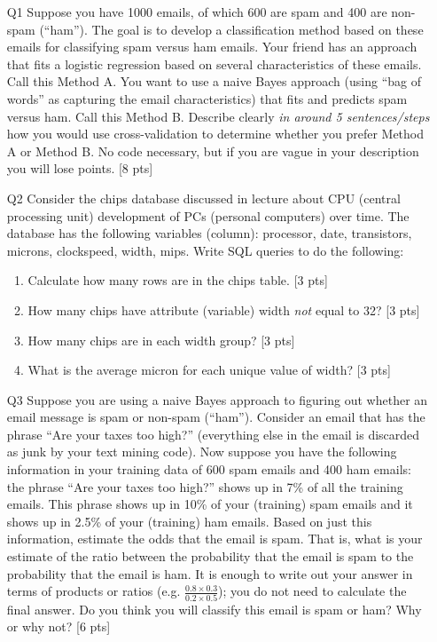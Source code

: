 \documentclass[12pt]{article}
\theoremstyle{Conjecture}
\theoremstyle{example}
\theoremstyle{remark}
\theoremstyle{lemma}
\theoremstyle{definition}
\theoremstyle{corol}
\theoremstyle{proposition}
\theoremstyle{condition}
\begin{document}
\begin{enumerate}

\item[Q1] Suppose you have 1000 emails, of which 600 are spam and 400
  are non-spam (``ham''). The goal is to develop a classification
  method based on these emails for classifying spam versus ham
  emails. Your friend has an approach that fits a logistic regression
  based on several characteristics of these emails. Call this Method
  A. You want to use a naive Bayes approach (using ``bag of words'' as
  capturing the email characteristics) that fits and predicts spam
  versus ham. Call this Method B. Describe clearly {\it in around 5
    sentences/steps} how you would use cross-validation to determine
  whether you prefer Method A or Method B. No code necessary, but if
  you are vague in your description you will lose points.  [8 pts]
\newpage

\item [Q2] Consider the chips database discussed in lecture about CPU
  (central processing unit) development of PCs (personal computers)
  over time. The database has the following variables (column):
  processor, date, transistors, microns, clockspeed, width,
  mips. Write SQL queries to do the following:
\begin{enumerate}
\item Calculate how many rows are in the chips table. [3 pts]
\item How many chips have attribute (variable) width {\it not} equal
  to 32? [3 pts]
\item How many chips are in each width group? [3 pts]
\item What is the average micron for each unique value of width? [3 pts]
\end{enumerate}
\newpage

\item [Q3] Suppose you are using a naive Bayes approach to figuring
  out whether an email message is spam or non-spam (``ham''). Consider
  an email that has the phrase ``Are your taxes too high?''
  (everything else in the email is discarded as junk by your text
  mining code). Now suppose you have the following information in your
  training data of 600 spam emails and 400 ham emails: the phrase
  ``Are your taxes too high?'' shows up in 7\% of all the training
  emails. This phrase shows up in 10\% of your (training) spam emails
  and it shows up in 2.5\% of your (training) ham emails. Based on
  just this information, estimate the odds that the email is
  spam. That is, what is your estimate of the ratio between the
  probability that the email is spam to the probability that the email
  is ham. It is enough to write out your answer in terms of products
  or ratios (e.g. $\frac{0.8\times 0.3}{0.2\times 0.5}$); you do not
  need to calculate the final answer. Do you think you will classify
  this email is spam or ham? Why or why not? [6 pts]


\end{enumerate}
\end{document}
